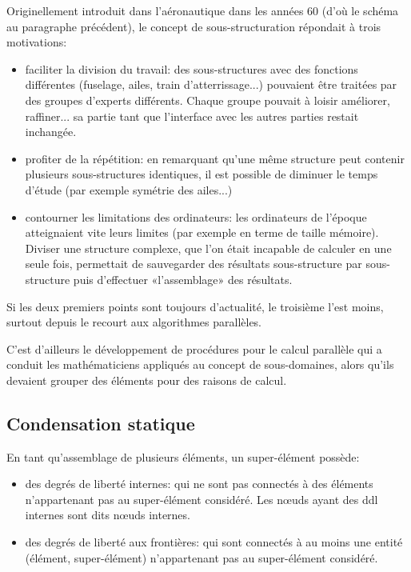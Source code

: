 \medskip
\begin{histoire}
Originellement introduit dans l'aéronautique dans les années 60 (d'où le schéma
au paragraphe précédent), le concept de sous-structuration
répondait à trois motivations:
\begin{itemize}
  \item faciliter la division du travail:
	des sous-structures avec des fonctions différentes (fuselage, ailes, train d'atterrissage...)
	pouvaient être traitées par des groupes d'experts différents. Chaque groupe pouvait
	à loisir améliorer, raffiner... sa partie tant que l'interface avec les autres parties
	restait inchangée.
  \item profiter de la répétition:
	en remarquant qu'une même structure peut contenir plusieurs sous-structures identiques,
	il est possible de diminuer le temps d'étude (par exemple symétrie des ailes...)
  \item contourner les limitations des ordinateurs:
	les ordinateurs de l'époque atteignaient vite leurs limites (par exemple en terme
	de taille mémoire). Diviser une structure complexe, que l'on était incapable de
	calculer en une seule fois, permettait de sauvegarder des résultats sous-structure
	par sous-structure puis d'effectuer «l'assemblage» des résultats.
\end{itemize}
Si les deux premiers points sont toujours d'actualité, le troisième l'est moins, surtout
depuis le recourt aux algorithmes parallèles.

C'est d'ailleurs le développement de procédures pour le calcul parallèle qui a conduit
les mathématiciens appliqués au concept de sous-domaines, alors qu'ils devaient grouper
des éléments pour des raisons de calcul.
\end{histoire}

\medskip
\subsection{Condensation statique}\label{Sec-condens}

En tant qu'assemblage de plusieurs éléments, un super-élément possède:
\begin{itemize}
  \item des degrés de liberté internes:
	qui ne sont pas connectés à des éléments n'appartenant pas au super-élément considéré.
	Les nœuds ayant des ddl internes sont dits nœuds internes.
  \item des degrés de liberté aux frontières:
	qui sont connectés à au moins une entité (élément, super-élément)
	n'appartenant pas au super-élément considéré.
\end{itemize}


